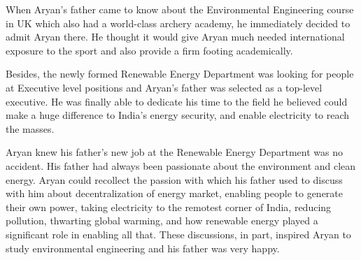 When Aryan's father came to know about the Environmental Engineering course in
UK which also had a world-class archery academy, he immediately decided to admit
Aryan there. He thought it would give Aryan much needed international exposure
to the sport and also provide a firm footing academically.

Besides, the newly formed Renewable Energy Department was looking for people at
Executive level positions and Aryan's father was selected as a top-level
executive. He was finally able to dedicate his time to the field he believed
could make a huge difference to India's energy security, and enable electricity
to reach the masses.

Aryan knew his father's new job at the Renewable Energy Department was no
accident. His father had always been passionate about the environment and clean
energy. Aryan could recollect the passion with which his father used to discuss
with him about decentralization of energy market, enabling people to generate
their own power, taking electricity to the remotest corner of India, reducing
pollution, thwarting global warming, and how renewable energy played a
significant role in enabling all that. These discussions, in part, inspired
Aryan to study environmental engineering and his father was very happy.